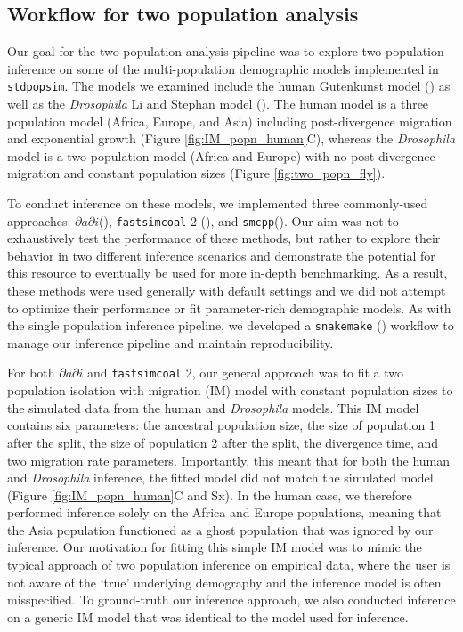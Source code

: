 \documentclass[12pt,halfline,a4paper]{ouparticle}
\newcommand{\stdpopsim}{\texttt{stdpopsim}\xspace}
\newcommand{\dadi}{$\partial a \partial i$\xspace}
\newcommand{\smcpp}{\texttt{smcpp}\xspace}
\newcommand{\fastsimcoal}{\texttt{fastsimcoal}\xspace}
\begin{document}
\subsection*{Workflow for two population analysis}
Our goal for the two population analysis pipeline was to explore two population inference
on some of the multi-population demographic models implemented in \stdpopsim.
The models we examined include the human Gutenkunst model (\cite{gutenkunst2009inferring}) as
well as the \emph{Drosophila} Li and Stephan model (\cite{li2006inferring}). The human
model is a three population model (Africa, Europe, and Asia) including post-divergence
migration and exponential growth (Figure \ref{fig:IM_popn_human}C), whereas the
\emph{Drosophila} model is a two population model (Africa and Europe) with no post-divergence
migration and constant population sizes (Figure \ref{fig:two_popn_fly}).

To conduct inference on these models, we implemented three commonly-used approaches:
\dadi (\cite{gutenkunst2009inferring}), \fastsimcoal2 (\cite{excoffier2013robust}),
and \smcpp (\cite{terhorst2017robust}). Our aim was not to exhaustively
test the performance of these methods, but rather to explore their behavior
in two different inference scenarios and demonstrate the potential for this resource to
eventually be used for more in-depth benchmarking. As a result, these methods were used
generally with default settings and we did not attempt to optimize their performance or fit
parameter-rich demographic models. As with the single population inference pipeline,
we developed a \texttt{snakemake} (\cite{koster2012snakemake}) workflow to manage
our inference pipeline and maintain reproducibility.

For both \dadi and \fastsimcoal2, our general approach was to fit a two population
isolation with migration (IM) model with constant population sizes to the simulated
data from the human and \emph{Drosophila} models. This IM model contains six parameters:
the ancestral population size, the size of population 1 after the split, the size of
population 2 after the split, the divergence time, and two migration rate parameters.
Importantly, this meant that for both the human and \emph{Drosophila} inference, the
fitted model did not match the simulated model (Figure \ref{fig:IM_popn_human}C and Sx).
In the human case, we therefore performed inference solely on the Africa
and Europe populations, meaning that the Asia population functioned as a ghost
population that was ignored by our inference. Our motivation for fitting this simple
IM model was to mimic the typical approach of two population inference on empirical
data, where the user is not aware of the `true' underlying demography and the inference
model is often misspecified. To ground-truth our inference approach, we also conducted
inference on a generic IM model that was identical to the model used for inference.
\end{document}
